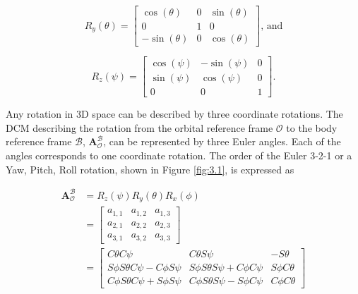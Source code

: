 \begin{equation}
    R_y(\theta) = \begin{bmatrix} 
        \cos(\theta) & 0 & \sin(\theta) \\
        0 & 1 & 0 \\
        -\sin(\theta) & 0  & \cos(\theta)
    \end{bmatrix}
    \text{, and}
    \label{Eq:3.2}
\end{equation}

\begin{equation}
    R_z(\psi) = \begin{bmatrix} 
        \cos(\psi) & -\sin(\psi) & 0 \\
        \sin(\psi) & \cos(\psi) & 0 \\
        0 & 0 & 1
    \end{bmatrix}
    \text{.}
    \label{Eq:3.3}
\end{equation}

\noindent Any rotation in 3D space can be described by three coordinate rotations. The DCM describing the rotation from 
the orbital reference frame $\mathcal{O}$ to the body reference frame $\mathcal{B}$, $\mathbf{A}_{\mathcal{O}}^{\mathcal{B}}$, 
can be represented by three Euler angles. Each of the angles corresponds to one coordinate rotation. The order
of the Euler 3-2-1 or a Yaw, Pitch, Roll rotation, shown in Figure \ref{fig:3.1}, is expressed as

\begin{equation}
\begin{split}
\boldsymbol{A}_{\mathcal{O}}^{\mathcal{B}} 
&= R_z(\psi) R_y(\theta) R_x(\phi) \\
&= \begin{bmatrix}
    a_{1,1} & a_{1,2} & a_{1,3} \\
    a_{2,1} & a_{2,2} & a_{2,3} \\
    a_{3,1} & a_{3,2} & a_{3,3}
\end{bmatrix} \\
&= \begin{bmatrix}
    C\theta C\psi & C\theta S\psi & -S\theta \\
    S\phi S\theta C\psi - C\phi S\psi & S\phi S\theta S\psi + C\phi C\psi & S\phi C\theta \\
    C\phi S\theta C\psi + S\phi S\psi & C\phi S\theta S\psi - S\phi C\psi & C\phi C\theta
\end{bmatrix}
\end{split}
\label{Eq:3.4}
\end{equation}


